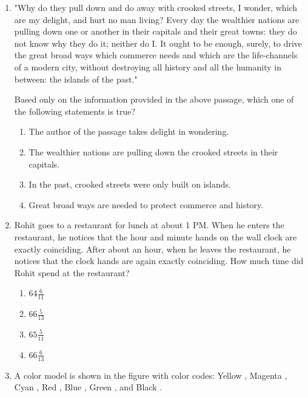 \documentclass[journal,12pt,onecolumn]{IEEEtran}
\theoremstyle{remark}
\begin{document}
\begin{enumerate}
		\item "Why do they pull down and do away with crooked streets, I wonder, which are my delight, and hurt no man living? Every day the wealthier nations are pulling down one or another in their capitals and their great towns: they do not know why they do it; neither do I. It ought to be enough, surely, to drive the great broad ways which commerce needs and which are the life-channels of a modern city, without destroying all history and all the humanity in between: the islands of the past." 
		
		Based only on the information provided in the above passage, which one of the following statements is true?
		
		\hfill{}
		
		\begin{enumerate}
			\item The author of the passage takes delight in wondering.
			\item The wealthier nations are pulling down the crooked streets in their capitals.
			\item In the past, crooked streets were only built on islands.
			\item Great broad ways are needed to protect commerce and history.
		\end{enumerate}
		
		\item Rohit goes to a restaurant for lunch at about 1 PM. When he enters the restaurant, he notices that the hour and minute hands on the wall clock are exactly coinciding. After about an hour, when he leaves the restaurant, he notices that the clock hands are again exactly coinciding. How much time  did Rohit spend at the restaurant?
		
		\hfill{}
		
		\begin{multicols}{2}
			\begin{enumerate}
				\item $64\frac{6}{11}$
				\item $66\frac{5}{13}$
				\item $65\frac{5}{11}$
				\item $66\frac{6}{13}$
			\end{enumerate}
		\end{multicols}
		
		\item A color model is shown in the figure with color codes: Yellow , Magenta , Cyan , Red , Blue , Green , and Black .
		

\end{enumerate}
\end{document}
